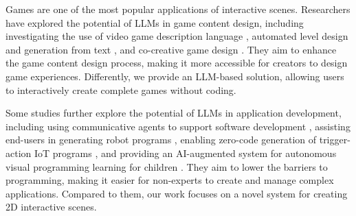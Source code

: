
Games are one of the most popular applications of interactive scenes. Researchers have explored the potential of LLMs in game content design, including investigating the use of video game description language \cite{hu2024generating}, automated level design and generation from text \cite{sudhakaran2024mariogpt, todd2023level}, and co-creative game design \cite{anjum2024ink}. They aim to enhance the game content {design}
process, making it more accessible for creators to {design} 
game experiences. 
{Differently, we provide an LLM-based solution, allowing users to interactively create complete games without coding.}

Some studies further explore the potential of LLMs in application development, including using communicative agents to support software development \cite{qian2024chatdev}, assisting end-users in generating robot programs \cite{bimbatti2023can}, enabling zero-code generation of trigger-action IoT programs \cite{li2023chatiot}, and providing an AI-augmented system for autonomous visual programming learning for children \cite{chen2024chatscratch}. They aim to lower the barriers to programming, making it easier for non-experts to create and manage complex applications. {Compared to them, our work focuses on a novel system for creating 2D interactive scenes.}


